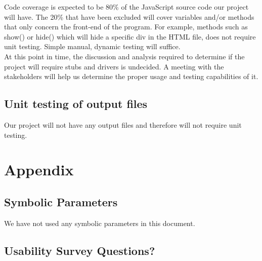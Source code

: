 \documentclass[12pt, titlepage]{article}
\begin{document}
Code coverage is expected to be 80\% of the JavaScript source code our project will have. The 20\% that have been excluded will cover variables and/or methods that only concern the front-end of the program. For example, methods such as show() or hide() which will hide a specific div in the HTML file, does not require unit testing. Simple manual, dynamic testing will suffice. \\

At this point in time, the discussion and analysis required to determine if the project will require stubs and drivers is undecided. A meeting with the stakeholders will help us determine the proper usage and testing capabilities of it. \\

\subsection{Unit testing of output files}		
Our project will not have any output files and therefore will not require unit testing.

%

%

\newpage

\section{Appendix}

\subsection{Symbolic Parameters}
We have not used any symbolic parameters in this document. 

\subsection{Usability Survey Questions?}
\end{document}
